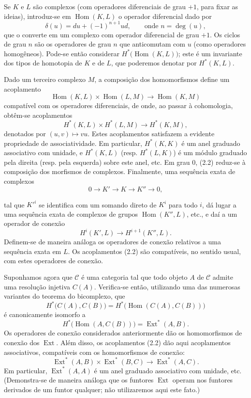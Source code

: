 \documentclass[11pt,twoside,openany]{book}
\numberwithin{equation}{section}
\newcommand{\src}[1]{%
  \phantomsection\hypertarget{src:#1}{}%
  \marginpar{\raggedleft\footnotesize\sffamily #1}%
}
\newcommand{\Ccat}{\mathcal C}
\theoremstyle{plain}
\theoremstyle{definition}
\theoremstyle{remark}
\newcommand{\FgaUnitKey}{frontmatter}
\renewcommand{\src}[1]{%
  \phantomsection\hypertarget{src:\FgaUnitKey:#1}{}%
  \marginpar{\raggedleft\footnotesize\sffamily #1}%
}
\begin{document}
Se $K$ e $L$ são complexos (com operadores diferenciais de grau $+1$, para
fixar as ideias), introduz-se em $\operatorname{Hom}(K,L)$ o operador
diferencial dado por
\begin{equation}\tag{2.1}
  \delta(u)=du+(-1)^{n+1}ud,\qquad\text{onde }n=\deg(u),
\end{equation}
que o converte em um complexo com operador diferencial de grau $+1$. Os ciclos de
grau $n$ são os operadores de grau $n$ que anticomutam com $u$ (como
operadores homogêneos). Pode-se então considerar
$H^{*}\bigl(\operatorname{Hom}(K,L)\bigr)$; este é um invariante dos tipos
de homotopia de $K$ e de $L$, que poderemos denotar por $H^{*}(K,L)$.

Dado um terceiro complexo $M$, a composição dos homomorfismos
define um acoplamento
\[
  \operatorname{Hom}(K,L)\times\operatorname{Hom}(L,M)
  \longrightarrow\operatorname{Hom}(K,M)
\]
compatível com os operadores diferenciais, de onde, ao passar à cohomologia,
obtêm-se acoplamentos
\begin{equation}\tag{2.2}
  H^{*}(K,L)\times H^{*}(L,M)\longrightarrow H^{*}(K,M),
\end{equation}
denotados por $(u,v)\longmapsto vu$. Estes acoplamentos satisfazem a evidente propriedade
de associatividade. Em particular, $H^{*}(K,K)$ é um anel graduado associativo
com unidade, e $H^{*}(K,L)$ (resp. $H^{*}(L,K)$) é um módulo graduado pela direita
(resp. pela esquerda) sobre este anel, etc. Em grau $0$, (2.2) reduz-se à
composição dos morfismos de complexos. Finalmente, uma sequência exata de
complexos
\[
  0\longrightarrow K'\longrightarrow K\longrightarrow K''\longrightarrow 0,
\]
\src{172}
tal que $K'^{i}$ se identifica com um somando direto de $K^{i}$ para todo $i$,
dá lugar a uma sequência exata de complexos de grupos
$\operatorname{Hom}(K'',L)$, etc., e daí a um operador de conexão
\[
  H^{i}(K',L)\longrightarrow H^{i+1}(K'',L).
\]
Definem-se de maneira análoga os operadores de conexão relativos a uma sequência exata em $L$. Os
acoplamentos (2.2) são compatíveis, no sentido usual, com estes operadores de conexão.

Suponhamos agora que $\Ccat$ é uma categoria tal que todo objeto $A$
de $\Ccat$ admite uma resolução injetiva $C(A)$. Verifica-se então, utilizando
uma das numerosas variantes do teorema do bicomplexo, que
\[
  H^{*}\bigl(C(A),C(B)\bigr)
  =H^{*}\bigl(\operatorname{Hom}(C(A),C(B))\bigr)
\]
é canonicamente isomorfo a
\[
  H^{*}\bigl(\operatorname{Hom}(A,C(B))\bigr)
  =\operatorname{Ext}^{*}(A,B).
\]
Os operadores de conexão considerados anteriormente dão os homomorfismos de conexão dos
$\operatorname{Ext}$. Além disso, os acoplamentos (2.2) dão aqui
acoplamentos associativos, compatíveis com os homomorfismos de conexão:
\begin{equation}\tag{2.3}
  \operatorname{Ext}^{*}(A,B)\times\operatorname{Ext}^{*}(B,C)
  \longrightarrow\operatorname{Ext}^{*}(A,C).
\end{equation}
Em particular, $\operatorname{Ext}^{*}(A,A)$ é um anel graduado associativo
com unidade, etc. (Demonstra-se de maneira análoga que os funtores
$\operatorname{Ext}$ operam nos funtores derivados de um funtor
qualquer; não utilizaremos aqui este fato.)
\end{document}
